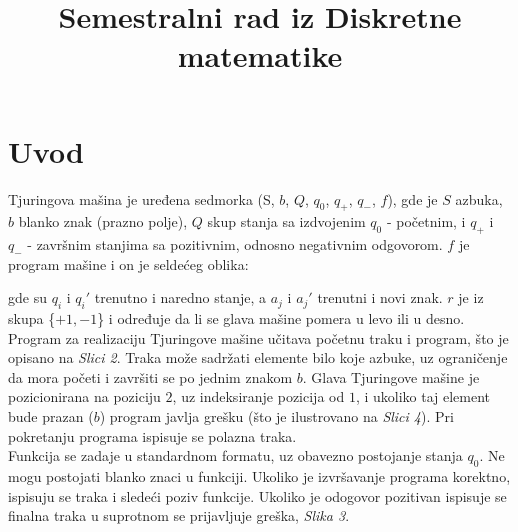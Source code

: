 \documentclass{article}
\title{Semestralni rad iz Diskretne matematike}
\author{Tjuringova mašina \vskip 1.25em}
\begin{document}
\maketitle
 
\sectionfont{\color{black}}
\section{Uvod}

Tjuringova mašina je uređena sedmorka (S, $b$, $Q$, $q_0$, $q_+$, $q_-$, $f$), gde je $S$ azbuka, $b$ blanko znak (prazno polje), $Q$ skup stanja sa izdvojenim $q_0$ - početnim, i $q_+$ i $q_-$ - završnim stanjima sa pozitivnim, odnosno negativnim odgovorom. $f$ je program mašine i on je seldećeg oblika:     
\begin{center} \textbf{} \end{center} 
gde su $q_i$ i $q_i'$ trenutno i naredno stanje, a $a_j$ i $a_j'$ trenutni i novi znak. $r$ je iz skupa \{$+1, -1$\} i određuje da li se glava mašine pomera u levo ili u desno.\\
Program za realizaciju Tjuringove mašine učitava početnu traku i program, što je opisano na {\it Slici 2}. Traka može sadržati elemente bilo koje azbuke, uz ograničenje da mora početi i završiti se po jednim znakom $b$. Glava Tjuringove mašine je pozicionirana na poziciju $2$, uz indeksiranje pozicija od $1$, i ukoliko taj element bude prazan ($b$) program javlja grešku (što je ilustrovano na {\it Slici 4}). Pri pokretanju programa ispisuje se polazna traka. \\
Funkcija se zadaje u standardnom formatu, uz obavezno postojanje stanja $q_0$. Ne mogu postojati blanko znaci u funkciji. Ukoliko je izvršavanje programa korektno, ispisuju se traka i sledeći poziv funkcije. Ukoliko je odogovor pozitivan ispisuje se finalna traka u suprotnom se prijavljuje greška, {\it Slika 3}.
\end{document}
